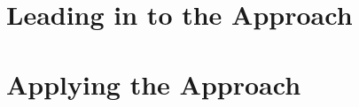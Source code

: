 \documentclass[12pt,oneside]{book}
\begin{document}
\part{Leading in to the Approach}







\label{chap:approach}

\part{Applying the Approach}
















	
	
\end{document}
